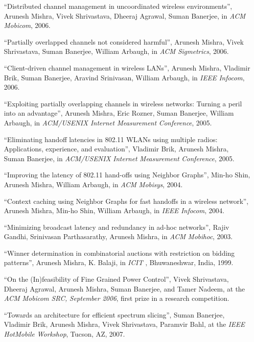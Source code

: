 \begin{resume}
\mybullet ``Distributed channel management in uncoordinated wireless environments'', Arunesh Mishra, Vivek Shrivastava,
Dheeraj Agrawal, Suman Banerjee, in {\em ACM Mobicom}, 2006.

\mybullet ``Partially overlapped channels not considered harmful'', Arunesh Mishra, Vivek Shrivastava, Suman Banerjee, William
Arbaugh, in {\em ACM Sigmetrics}, 2006.

\mybullet ``Client-driven channel management in wireless LANs'', Arunesh Mishra, Vladimir Brik, Suman Banerjee, Aravind
Srinivasan, William Arbaugh, in {\em IEEE Infocom}, 2006.

\mybullet ``Exploiting partially overlapping channels in wireless networks: Turning a peril into an advantage'',
Arunesh Mishra, Eric Rozner, Suman Banerjee, William Arbaugh, in  {\em  ACM/USENIX Internet Measurement Conference}, 2005.

\mybullet ``Eliminating handoff latencies in 802.11 WLANs using multiple radios: Applications, experience, and evaluation'', 
Vladimir Brik, Arunesh Mishra, Suman Banerjee, in {\em ACM/USENIX Internet Measurement Conference}, 2005.

\mybullet ``Improving the latency of 802.11 hand-offs using Neighbor Graphs'',
Min-ho Shin, Arunesh Mishra, William Arbaugh, in {\em ACM Mobisys},  2004.

\mybullet ``Context caching using Neighbor Graphs for fast handoffs in a wireless network'', Arunesh Mishra, 
Min-ho Shin, William Arbaugh, in {\em  IEEE Infocom}, 2004.

\mybullet ``Minimizing broadcast latency and redundancy in ad-hoc networks'', Rajiv Gandhi, Srinivasan Parthasarathy, 
Arunesh Mishra, in {\em ACM Mobihoc}, 2003.

\mybullet ``Winner determination in combinatorial auctions with restriction on bidding patterns'', Arunesh Mishra, 
K. Balaji, in {\em ICIT }, Bhuwaneshwar, India, 1999.

\vspace{-0.7cm}

\mybullet ``On the (In)feasibility of Fine Grained Power Control'', Vivek Shrivastava, Dheeraj Agrawal, Arunesh Mishra, Suman Banerjee, and Tamer Nadeem,
at the {\it ACM Mobicom SRC, September 2006}, first prize in a research competition.

\mybullet ``Towards an architecture for efficient spectrum slicing'', Suman Banerjee, Vladimir Brik, Arunesh Mishra, Vivek
Shrivastava, Paramvir Bahl, at the  {\it IEEE HotMobile Workshop}, Tucson, AZ, 2007.


\end{resume}
